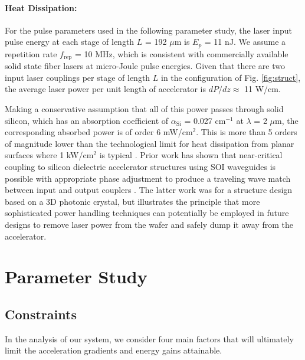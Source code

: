 \paragraph{Heat Dissipation:}

For the pulse parameters used in the following parameter study, the laser input pulse energy at each stage of length $L$ = 192 $\mu$m is $E_p$ = 11 nJ.
We assume a repetition rate $f_\text{rep}$ = 10 MHz, which is consistent with commercially available solid state fiber lasers at micro-Joule pulse energies.
Given that there are two input laser couplings per stage of length $L$ in the configuration of Fig.
\ref{fig:struct}, the average laser power per unit length of accelerator is $dP/dz \approx$ 11 W/cm.

Making a conservative assumption that all of this power passes through solid silicon, which has an absorption coefficient of $\alpha_\text{Si}$ = 0.027 $\text{cm}^{-1}$ at $\lambda$ = 2 $\mu$m, the corresponding absorbed power is of order 6 mW/$\text{cm}^2$.
This is more than 5 orders of magnitude lower than the technological limit for heat dissipation from planar surfaces where 1 kW/$\text{cm}^2$ is typical \cite{eggleston:1984,rutherford:2000}.
Prior work has shown that near-critical coupling to silicon dielectric accelerator structures using SOI waveguides is possible with appropriate phase adjustment to produce a traveling wave match between input and output couplers \cite{wu:2014}.
The latter work was for a structure design based on a 3D photonic crystal, but illustrates the principle that more sophisticated power handling techniques can potentially be employed in future designs to remove laser power from the wafer and safely dump it away from the accelerator.

\section{Parameter Study}

\subsection{\label{sec:constraints}Constraints}

In the analysis of our system, we consider four main factors that will ultimately limit the acceleration gradients and energy gains attainable.

